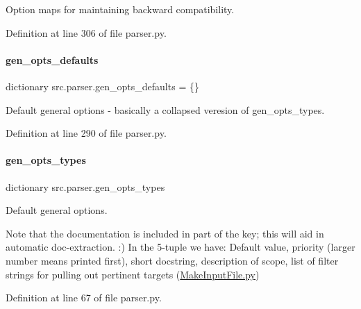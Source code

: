 Option maps for maintaining backward compatibility. 



Definition at line 306 of file parser.\+py.

\mbox{\label{namespacesrc_1_1parser_ad13e9dbc3f7c04ae17a7511611623c05}} 
\paragraph{\texorpdfstring{gen\+\_\+opts\+\_\+defaults}{gen\_opts\_defaults}}
{\footnotesize\ttfamily dictionary src.\+parser.\+gen\+\_\+opts\+\_\+defaults = \{\}}



Default general options -\/ basically a collapsed veresion of gen\+\_\+opts\+\_\+types. 



Definition at line 290 of file parser.\+py.

\mbox{\label{namespacesrc_1_1parser_a87f26164b219a12ecb4b5e6408993d9f}} 
\paragraph{\texorpdfstring{gen\+\_\+opts\+\_\+types}{gen\_opts\_types}}
{\footnotesize\ttfamily dictionary src.\+parser.\+gen\+\_\+opts\+\_\+types}



Default general options. 

Note that the documentation is included in part of the key; this will aid in automatic doc-\/extraction. \+:) In the 5-\/tuple we have\+: Default value, priority (larger number means printed first), short docstring, description of scope, list of filter strings for pulling out pertinent targets (\hyperlink{MakeInputFile_8py}{Make\+Input\+File.\+py}) 

Definition at line 67 of file parser.\+py.

\mbox{\label{namespacesrc_1_1parser_aa00075364aedd66048fd3e55084557e3}} 
